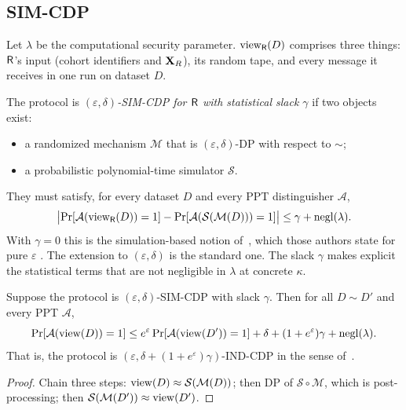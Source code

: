 \subsection{SIM-CDP}

Let $\lambda$ be the computational security parameter. $\mathrm{view}_{\mathsf{R}}(D)$ comprises three things: $\mathsf{R}$'s input (cohort identifiers and $\mathbf{X}_R$), its random tape, and every message it receives in one run on dataset $D$.

\begin{definition}\label{def:simcdp}
The protocol is \emph{$(\varepsilon,\delta)$-SIM-CDP for $\mathsf{R}$ with statistical slack $\gamma$} if two objects exist:
\begin{itemize}[nosep]
  \item a randomized mechanism $\mathcal M$ that is $(\varepsilon,\delta)$-DP with respect to $\sim$;
  \item a probabilistic polynomial-time simulator $\mathcal S$.
\end{itemize}
They must satisfy, for every dataset $D$ and every PPT distinguisher $\mathcal A$,
\[
  \bigl|\Pr[\mathcal A(\mathrm{view}_{\mathsf{R}}(D))=1]-\Pr[\mathcal A(\mathcal S(\mathcal M(D)))=1]\bigr|\le\gamma+\mathrm{negl}(\lambda).
\]
With $\gamma=0$ this is the simulation-based notion of~\cite{MPRV09}, which those authors state for pure $\varepsilon$ . The extension to $(\varepsilon,\delta)$ is the standard one. The slack $\gamma$ makes explicit the statistical terms that are not negligible in $\lambda$ at concrete $\kappa$.
\end{definition}

\begin{lemma}\label{lem:sim2ind}
Suppose the protocol is $(\varepsilon,\delta)$-SIM-CDP with slack $\gamma$. Then for all $D\sim D'$ and every PPT $\mathcal A$,
\[
  \Pr[\mathcal A(\mathrm{view}(D))=1]\le e^\varepsilon\Pr[\mathcal A(\mathrm{view}(D'))=1]+\delta+(1+e^\varepsilon)\gamma+\mathrm{negl}(\lambda).
\]
That is, the protocol is $(\varepsilon,\delta+(1+e^\varepsilon)\gamma)$-IND-CDP in the sense of~\cite{MPRV09}.
\end{lemma}
\begin{proof}
Chain three steps: $\mathrm{view}(D)\approx\mathcal S(\mathcal M(D))$; then DP of $\mathcal S\circ\mathcal M$, which is post-processing; then $\mathcal S(\mathcal M(D'))\approx\mathrm{view}(D')$.
\end{proof}

